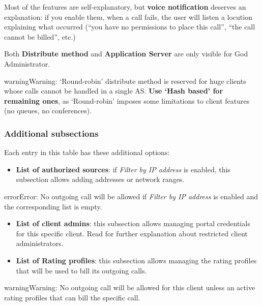 \documentclass[letterpaper,10pt,english]{sphinxmanual}
\begin{document}
Most of the features are self-explanatory, but \textbf{voice notification} deserves
an explanation: if you enable them, when a call fails, the user will listen a
locution explaining what occurred (``you have no permissions to place this call'',
``the call cannot be billed'', etc.)

Both \textbf{Distribute method} and \textbf{Application Server} are only visible for God
Administrator.

\begin{notice}{warning}{Warning:}
`Round-robin' distribute method is reserved for huge clients
whose calls cannot be handled in a single AS. \textbf{Use `Hash based'
for remaining ones}, as `Round-robin' imposes some limitations
to client features (no queues, no conferences).
\end{notice}


\subsubsection{Additional subsections}
\label{administration_portal/brand/clients/virtual_pbx:additional-subsections}
Each entry in this table has these additional options:
\begin{itemize}
\item {} 
\textbf{List of authorized sources}: if \emph{Filter by IP address} is enabled, this subsection allows adding addresses or network ranges.

\end{itemize}

\begin{notice}{error}{Error:}
No outgoing call will be allowed if \emph{Filter by IP address} is enabled and the corresponding list is empty.
\end{notice}
\begin{itemize}
\item {} 
\textbf{List of client admins}: this subsection allows managing portal credentials for this specific client. Read {\hyperref[api_rest/acls:acls]{}}
for further explanation about restricted client administrators.

\item {} 
\textbf{List of Rating profiles}: this subsection allows managing the rating profiles that will be used to bill its outgoing calls.

\end{itemize}

\begin{notice}{warning}{Warning:}
No outgoing call will be allowed for this client unless an active rating profiles that can
bill the specific call.
\end{notice}
\end{document}
